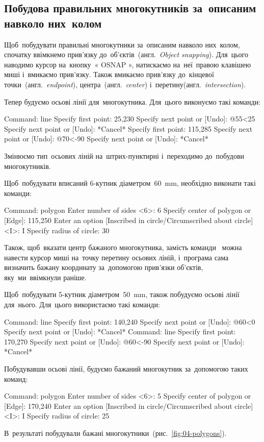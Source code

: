 \documentclass[
	a4paper,
	oneside,
	BCOR = 10mm,
	DIV = 12,
	12pt,
	headings = normal,
]{scrartcl}
\newcommand{\allcaps}[1]{%
	{%
		\addfontfeatures{%
			Letters = UppercaseSmallCaps,
			LetterSpace = 8,%
		}%
		#1%
	}%
}
\newcommand{\transeng}[1]{{англ.}~\textit{\textenglish{#1}}}
\begin{document}
		\subsection{Побудова правильних многокутників за~описаним навколо них~колом}
			Щоб~побудувати правильні многокутники за~описаним навколо них~колом, спочатку ввімкнемо прив'язку до~об'єктів~(\transeng{Object snapping}). Для~цього наводимо курсор на~кнопку~«\textenglish{\allcaps{OSNAP}}», натискаємо на~неї~правою клавішею миші і~вмикаємо прив'язку. Також вмикаємо прив'язку до~кінцевої точки~(\transeng{endpoint}), центра~(\transeng{center}) і~перетину(\transeng{intersection}).

			Тепер будуємо осьові лінії для~многокутника. Для~цього виконуємо такі команди:
			\begin{codegeneric}
				Command: line
				Specify first point: 25,230
				Specify next point or [Undo]: @55<25
				Specify next point or [Undo]: *Cancel*
				Specify first point: 115,285
				Specify next point or [Undo]: @70<-90
				Specify next point or [Undo]: *Cancel*
			\end{codegeneric}
			Змінюємо тип~осьових ліній на~штрих-пунктирні і~переходимо до~побудови многокутників.

			Щоб~побудувати вписаний 6-кутник діаметром~\SI{60}{\milli\metre}, необхідно виконати такі команди:
			\begin{codegeneric}
				Command: polygon
				Enter number of sides <6>: 6
				Specify center of polygon or [Edge]: 115,250
				Enter an option [Inscribed in circle/Circumscribed about circle] <I>: I
				Specify radius of circle: 30
			\end{codegeneric}
			Також, щоб~вказати центр бажаного многокутника, замість команди~ можна навести курсор миші на~точку перетину осьових ліній, і~програма сама визначить бажану координату за~допомогою прив'язки об'єктів, яку~ми~ввімкнули раніше.

			Щоб~побудувати 5-кутник діаметром~\SI{50}{\milli\metre}, також побудуємо осьові лінії для~нього. Для~цього використаємо такі команди:
			\begin{codegeneric}
				Command: line
				Specify first point: 140,240
				Specify next point or [Undo]: @60<0
				Specify next point or [Undo]: *Cancel*
				Command: line
				Specify first point: 170,270
				Specify next point or [Undo]: @60<-90
				Specify next point or [Undo]: *Cancel*
			\end{codegeneric}
			Побудувавши осьові лінії, будуємо бажаний многокутник за~допомогою таких команд:
			\begin{codegeneric}
				Command: polygon
				Enter number of sides <6>: 5
				Specify center of polygon or [Edge]: 170,240
				Enter an option [Inscribed in circle/Circumscribed about circle] <I>: I
				Specify radius of circle: 25
			\end{codegeneric}
			В~результаті побудували бажані многокутники~(рис.~\ref{fig:04-polygons}).
\end{document}
